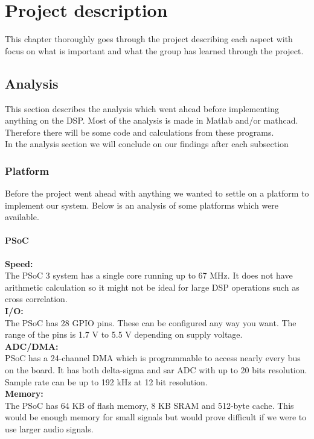 \chapter{Project description}
This chapter thoroughly goes through the project describing each aspect with focus on what is important and what the group has learned through the project.
\section{Analysis}
This section describes the analysis which went ahead before implementing anything on the DSP. Most of the analysis is made in Matlab and/or mathcad. Therefore there will be some code and calculations from these programs.\\
In the analysis section we will conclude on our findings after each subsection
\subsection{Platform}
Before the project went ahead with anything we wanted to settle on a platform to implement our system. Below is an analysis of some platforms which were available.
\subsubsection{PSoC}
\textbf{Speed:}\\
The PSoC 3 system has a single core running up to 67 MHz. It does not have arithmetic calculation so it might not be ideal for large DSP operations such as cross correlation. \\
\textbf{I/O:}\\
The PSoC has 28 GPIO pins. These can be configured any way you want. The range of the pins is 1.7 V to 5.5 V depending on supply voltage. \\
\textbf{ADC/DMA:}\\
PSoC has a 24-channel DMA which is programmable to access nearly every bus on the board. It has both delta-sigma and sar ADC with up to 20 bits resolution. Sample rate can be up to 192 kHz at 12 bit resolution. \\
\textbf{Memory:}\\
The PSoC has 64 KB of flash memory, 8 KB SRAM and 512-byte cache. This would be enough memory for small signals but would prove difficult if we were to use larger audio signals.\\
